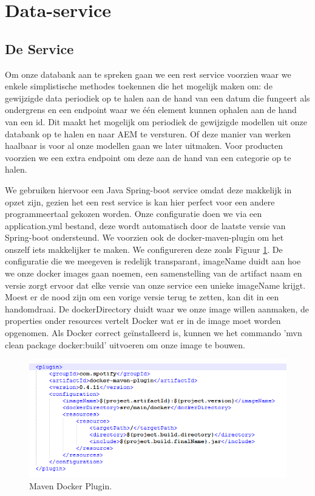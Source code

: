 \documentclass{article}
\begin{document}
	\section{Data-service}
	
	\subsection{De Service}
	Om onze databank aan te spreken gaan we een rest service voorzien waar we enkele simplistische methodes toekennen die het mogelijk maken om: de gewijzigde data periodiek op te halen aan de hand van een datum die fungeert als ondergrens en een endpoint waar we één element kunnen ophalen aan de hand van een id. Dit maakt het mogelijk om periodiek de gewijzigde modellen uit onze databank op te halen en naar AEM te versturen. Of deze manier van werken haalbaar is voor al onze modellen gaan we later uitmaken. Voor producten voorzien we een extra endpoint om deze aan de hand van een categorie op te halen. 
	\par
	We gebruiken hiervoor een Java Spring-boot service omdat deze makkelijk in opzet zijn, gezien het een rest service is kan hier perfect voor een andere programmeertaal gekozen worden. Onze configuratie doen we via een application.yml bestand, deze wordt automatisch door de laatste versie van Spring-boot ondersteund. We voorzien ook de docker-maven-plugin om het onszelf iets makkelijker te maken. We configureren deze zoals Figuur \ref{fig:docker-plugin}. De configuratie die we meegeven is redelijk transparant, imageName duidt aan hoe we onze docker images gaan noemen, een samenstelling van de artifact naam en versie zorgt ervoor dat elke versie van onze service een unieke imageName krijgt. Moest er de nood zijn om een vorige versie terug te zetten, kan dit in een handomdraai. De dockerDirectory duidt waar we onze image willen aanmaken, de properties onder resources vertelt Docker wat er in de image moet worden opgenomen. Als Docker correct geïnstalleerd is, kunnen we het commando 'mvn clean package docker:build' uitvoeren om onze image te bouwen.
	
	\begin{figure}[h!]
		\centering
  		\includegraphics[width=\linewidth]{images/maven-plugin.PNG}
  		\caption{Maven Docker Plugin.}
  		\label{fig:docker-plugin}
	\end{figure}
\end{document}
